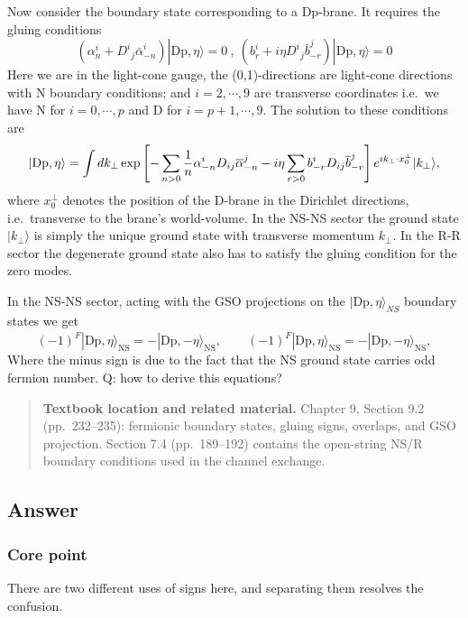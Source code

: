 \documentclass[
  10pt,
  a4paper,
  openany]{book}
\begin{document}
Now consider the boundary state corresponding to a Dp-brane. It requires
the gluing conditions \[
(\alpha^i_{n}+{D^i}_{j}\bar{\alpha}^i_{-n})|\mathrm{Dp},\eta \rangle=0 \ , \ (b^i_{r}+i\eta{D^i}_{j} \bar{b}^j_{-r})|\mathrm{Dp},\eta \rangle=0
\] Here we are in the light-cone gauge, the (0,1)-directions are
light-cone directions with N boundary conditions; and \(i=2,\cdots,9\)
are transverse coordinates i.e.~we have N for \(i=0,\cdots,p\) and D for
\(i=p+1,\cdots,9\). The solution to these conditions are \[
|{\rm Dp},\eta\rangle=\int d k_{\perp} \exp \left[-\sum_{n>0}\frac{1}{n} \alpha^{i}_{-n} D_{ij} \overline{\alpha}^{j}_{-n} -i \eta\sum_{r>0}b^{ i}_{-r} D_{ij} \overline{b}^{j}_{-r} \right] e^{i k_{\perp}\cdot x_{0}^{ \perp}} |k_{\perp}\rangle ,
\] where \(x^\perp_{0}\) denotes the position of the D-brane in the
Dirichlet directions, i.e.~transverse to the brane's world-volume. In
the NS-NS sector the ground state \(|k_{\perp}\rangle\) is simply the
unique ground state with transverse momentum \(k_{\perp}\). In the R-R
sector the degenerate ground state also has to satisfy the gluing
condition for the zero modes.

In the NS-NS sector, acting with the GSO projections on the
\(|\mathrm{Dp},\eta \rangle_{NS}\) boundary states we get \[
(-1)^{F}|\mathrm{Dp},\eta\rangle_{\mathrm{NS}}=-|\mathrm{Dp},-\eta\rangle_{ \mathrm{NS}},\qquad(-1)^{\overline{F}}|\mathrm{Dp},\eta\rangle_{\mathrm{NS}}= -|\mathrm{Dp},-\eta\rangle_{\mathrm{NS}},
\] Where the minus sign is due to the fact that the NS ground state
carries odd fermion number. Q: how to derive this equations?

\begin{quote}
\textbf{Textbook location and related material.} Chapter 9, Section 9.2
(pp.~232--235): fermionic boundary states, gluing signs, overlaps, and
GSO projection. Section 7.4 (pp.~189--192) contains the open-string NS/R
boundary conditions used in the channel exchange.
\end{quote}

\subsection{Answer}\label{answer-7}

\subsubsection{Core point}\label{core-point-7}

There are two different uses of signs here, and separating them resolves
the confusion.
\end{document}
